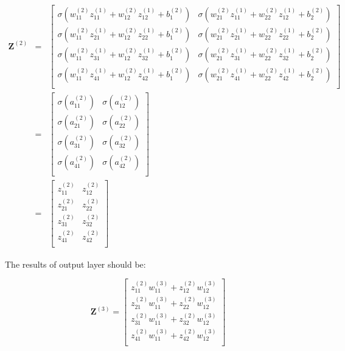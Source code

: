 \documentclass{article}
\begin{document}
\begin{eqnarray}
\mathbf{Z}^{(2)} 
& = & \left[\begin{array}{ccc}
	\sigma(w^{(2)}_{11}z^{(1)}_{11} + w^{(2)}_{12}z^{(1)}_{12} + b^{(2)}_1) &
	\sigma(w^{(2)}_{21}z^{(1)}_{11} + w^{(2)}_{22}z^{(1)}_{12} + b^{(2)}_2) \\
	\sigma(w^{(2)}_{11}z^{(1)}_{21} + w^{(2)}_{12}z^{(1)}_{22} + b^{(2)}_1) &
	\sigma(w^{(2)}_{21}z^{(1)}_{21} + w^{(2)}_{22}z^{(1)}_{22} + b^{(2)}_2) \\
	\sigma(w^{(2)}_{11}z^{(1)}_{31} + w^{(2)}_{12}z^{(1)}_{32} + b^{(2)}_1) &
	\sigma(w^{(2)}_{21}z^{(1)}_{31} + w^{(2)}_{22}z^{(1)}_{32} + b^{(2)}_2) \\
	\sigma(w^{(2)}_{11}z^{(1)}_{41} + w^{(2)}_{12}z^{(1)}_{42} + b^{(2)}_1) &
	\sigma(w^{(2)}_{21}z^{(1)}_{41} + w^{(2)}_{22}z^{(1)}_{42} + b^{(2)}_2) \\
\end{array}
\right] \nonumber \\
& = & \left[\begin{array}{ccc}	
	\sigma(a^{(2)}_{11}) & \sigma(a^{(2)}_{12}) \\
	\sigma(a^{(2)}_{21}) & \sigma(a^{(2)}_{22}) \\
	\sigma(a^{(2)}_{31}) & \sigma(a^{(2)}_{32}) \\
	\sigma(a^{(2)}_{41}) & \sigma(a^{(2)}_{42}) \\
\end{array}
\right] \nonumber \\
& = & \left[\begin{array}{ccc}	
	z^{(2)}_{11} & z^{(2)}_{12} \\
	z^{(2)}_{21} & z^{(2)}_{22} \\
	z^{(2)}_{31} & z^{(2)}_{32} \\
	z^{(2)}_{41} & z^{(2)}_{42} \\
\end{array}
\right]
\end{eqnarray}

\noindent The results of output layer should be:

\begin{equation}
\mathbf{Z}^{(3)} = \left[\begin{array}{c}
	z^{(2)}_{11}w^{(3)}_{11} + z^{(2)}_{12}w^{(3)}_{12} \\
	z^{(2)}_{21}w^{(3)}_{11} + z^{(2)}_{22}w^{(3)}_{12} \\
	z^{(2)}_{31}w^{(3)}_{11} + z^{(2)}_{32}w^{(3)}_{12} \\
	z^{(2)}_{41}w^{(3)}_{11} + z^{(2)}_{42}w^{(3)}_{12} \\
\end{array}
\right]
\end{equation}
\end{document}
